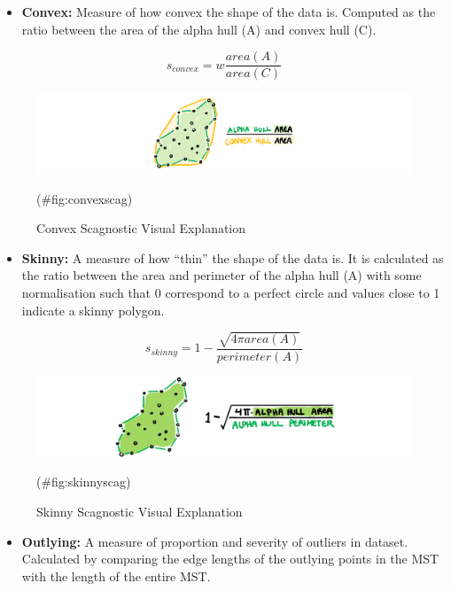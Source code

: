 \begin{itemize}
\tightlist
\item
  \textbf{Convex:} Measure of how convex the shape of the data is.
  Computed as the ratio between the area of the alpha hull (A) and
  convex hull (C).
\end{itemize}

\[s_{convex}=w\frac{area(A)}{area(C)}\]

\begin{Schunk}
\begin{figure}
\includegraphics[width=1\linewidth,height=0.2\textheight]{figures/drawconvex} \caption[Convex Scagnostic Visual Explanation]{Convex Scagnostic Visual Explanation}(\#fig:convexscag)
\end{figure}
\end{Schunk}

\begin{itemize}
\tightlist
\item
  \textbf{Skinny:} A measure of how ``thin'' the shape of the data is.
  It is calculated as the ratio between the area and perimeter of the
  alpha hull (A) with some normalisation such that 0 correspond to a
  perfect circle and values close to 1 indicate a skinny polygon.
\end{itemize}

\[s_{skinny}= 1-\frac{\sqrt{4\pi area(A)}}{perimeter(A)}\]

\begin{Schunk}
\begin{figure}
\includegraphics[width=1\linewidth,height=0.2\textheight]{figures/drawskinny} \caption[Skinny Scagnostic Visual Explanation]{Skinny Scagnostic Visual Explanation}(\#fig:skinnyscag)
\end{figure}
\end{Schunk}

\begin{itemize}
\tightlist
\item
  \textbf{Outlying:} A measure of proportion and severity of outliers in
  dataset. Calculated by comparing the edge lengths of the outlying
  points in the MST with the length of the entire MST.
\end{itemize}


